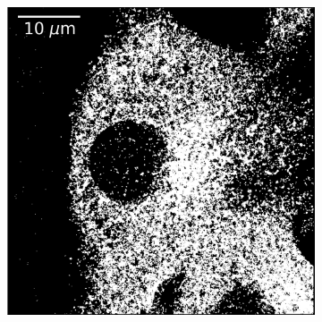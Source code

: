 \begin{figure}[htbp]
\begin{subfigure}{0.49\textwidth}
        \includegraphics[width=\textwidth]{figures/clathrin_image6.png}
        \caption{}
    \end{subfigure}
    

\end{figure}
